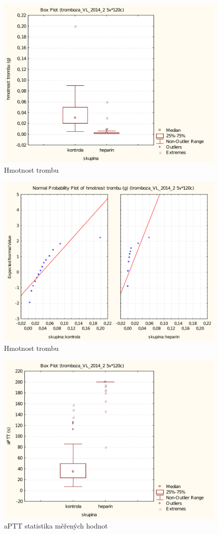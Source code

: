 \documentclass[12pt]{article}
\begin{document}
\begin{figure}[h!]
	\begin{centering}
	\includegraphics[width=0.7\linewidth]{hmotnost-trombu-box.pdf}
	\caption{Hmotnost trombu}
	\end{centering}
\end{figure}

\begin{figure}[h!]
	\begin{centering}
	\includegraphics[width=0.7\linewidth]{hmotnost-trombu-prob.pdf}
	\caption{Hmotnost trombu}
	\end{centering}
\end{figure}

\begin{figure}[h!]
	\begin{centering}
	\includegraphics[width=0.7\linewidth]{aPTT-box.pdf}
	\caption{aPTT statistika měřených hodnot}
	\end{centering}
\end{figure}
\end{document}
